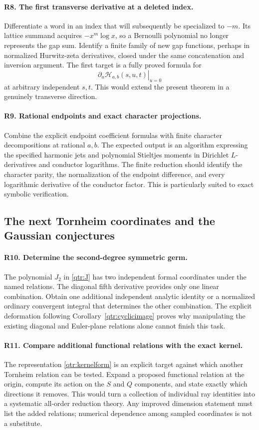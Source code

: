 \documentclass[11pt,a4paper]{article}
\numberwithin{equation}{section}
\theoremstyle{definition}
\theoremstyle{remark}
\begin{document}
\paragraph{R8. The first transverse derivative at a deleted index.}
Differentiate a word in an index that will subsequently
be specialized to $-m$. Its lattice summand acquires
$-x^m\log x$, so a Bernoulli polynomial no longer
represents the gap sum. Identify a finite family of
new gap functions, perhaps in normalized Hurwitz-zeta
derivatives, closed under the same concatenation and
inversion argument. The first target is a fully proved
formula for
\[
 \left.\partial_u\mathcal H_{a,b}(s,u,t)\right|_{u=0}
\]
at arbitrary independent $s,t$. This would extend the
present theorem in a genuinely transverse direction.

\paragraph{R9. Rational endpoints and exact character projections.}
Combine the explicit endpoint coefficient formulas with
finite character decompositions at rational $a,b$.
The expected output is an algorithm expressing the
specified harmonic jets and polynomial Stieltjes moments
in Dirichlet $L$-derivatives and conductor logarithms.
The finite reduction should identify the character
parity, the normalization of the endpoint difference,
and every logarithmic derivative of the conductor
factor. This is particularly suited to exact symbolic
verification.

\subsection{The next Tornheim coordinates and the Gaussian conjectures}

\paragraph{R10. Determine the second-degree symmetric germ.}
The polynomial $J_2$ in \eqref{qtr:J} has two independent
formal coordinates under the named relations.
The diagonal fifth derivative provides only one linear
combination. Obtain one additional independent analytic
identity or a normalized ordinary convergent integral
that determines the other combination. The explicit
deformation following Corollary~\ref{qtr:cyclicimage}
proves why manipulating the existing diagonal and
Euler-plane relations alone cannot finish this task.

\paragraph{R11. Compare additional functional relations with the exact kernel.}
The representation \eqref{qtr:kernelform} is an explicit
target against which another Tornheim relation can be
tested. Expand a proposed functional relation at the
origin, compute its action on the $S$ and $Q$ components,
and state exactly which directions it removes. This
would turn a collection of individual ray identities
into a systematic all-order reduction theory. Any
improved dimension statement must list the added
relations; numerical dependence among sampled
coordinates is not a substitute.
\end{document}
